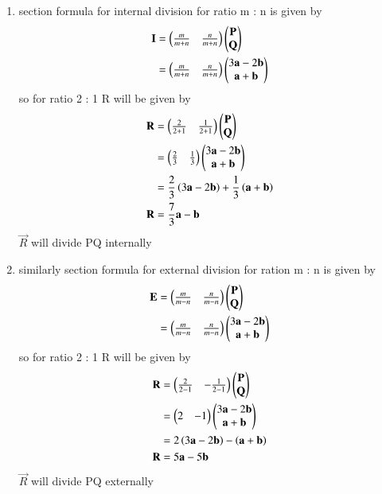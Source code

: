 \documentclass[journal,12pt,twocolumn]{IEEEtran}
\begin{document}
\begin{enumerate}
\item 
section formula for internal division for ratio m : n is given by 
\begin{align}
\mathbf{I} &= \begin{pmatrix}\frac{m}{m+n} & \frac{n}{m+n}\end{pmatrix}\begin{pmatrix}\mathbf{P}\\\mathbf{Q}\end{pmatrix}\\
&= \begin{pmatrix}\frac{m}{m+n} & \frac{n}{m+n}\end{pmatrix}\begin{pmatrix} 3\mathbf{a} - 2\mathbf{b} \\ \mathbf{a} +\mathbf{b}\end{pmatrix}\\
\end{align}
so for ratio 2 : 1 R will be given by
\begin{align}
\mathbf{R} &= \begin{pmatrix}\frac{2}{2+1} & \frac{1}{2+1}\end{pmatrix}\begin{pmatrix}\mathbf{P}\\\mathbf{Q}\end{pmatrix}\\
&= \begin{pmatrix}\frac{2}{3}&\frac{1}{3}\end{pmatrix}\begin{pmatrix} 3\mathbf{a} - 2\mathbf{b} \\ \mathbf{a} +\mathbf{b}\end{pmatrix}\\
&= \frac{2}{3}\left(3\mathbf{a} - 2\mathbf{b}\right) + \frac{1}{3}\left(\mathbf{a} +\mathbf{b}\right)\\
\mathbf{R} &= \frac{7}{3}\mathbf{a} - \mathbf{b}
\end{align}
$\vec{R}$ will divide PQ internally\\
\item similarly section formula for external division for ration m : n is given by
\begin{align}
\mathbf{E} &= \begin{pmatrix}\frac{m}{m-n} & \frac{n}{m-n}\end{pmatrix}\begin{pmatrix}\mathbf{P}\\\mathbf{Q}\end{pmatrix}\\
&= \begin{pmatrix}\frac{m}{m-n} & \frac{n}{m-n}\end{pmatrix}\begin{pmatrix}3\mathbf{a} - 2\mathbf{b} \\ \mathbf{a} +\mathbf{b}\end{pmatrix}
\end{align}
so for ratio 2 : 1 R will be given by
\begin{align}
\mathbf{R} &= \begin{pmatrix}\frac{2}{2-1} & -\frac{1}{2-1}\end{pmatrix}\begin{pmatrix}\mathbf{P}\\\mathbf{Q}\end{pmatrix}\\
&= \begin{pmatrix}2 & -1\end{pmatrix}\begin{pmatrix}3\mathbf{a} - 2\mathbf{b} \\ \mathbf{a} +\mathbf{b}\end{pmatrix}\\
&= 2\left(3\mathbf{a} - 2\mathbf{b}\right) - \left(\mathbf{a} +\mathbf{b}\right)\\
\mathbf{R} &= 5\mathbf{a} - 5\mathbf{b}
\end{align}
$\vec{R}$ will divide PQ externally
\end{enumerate}
\end{document}

